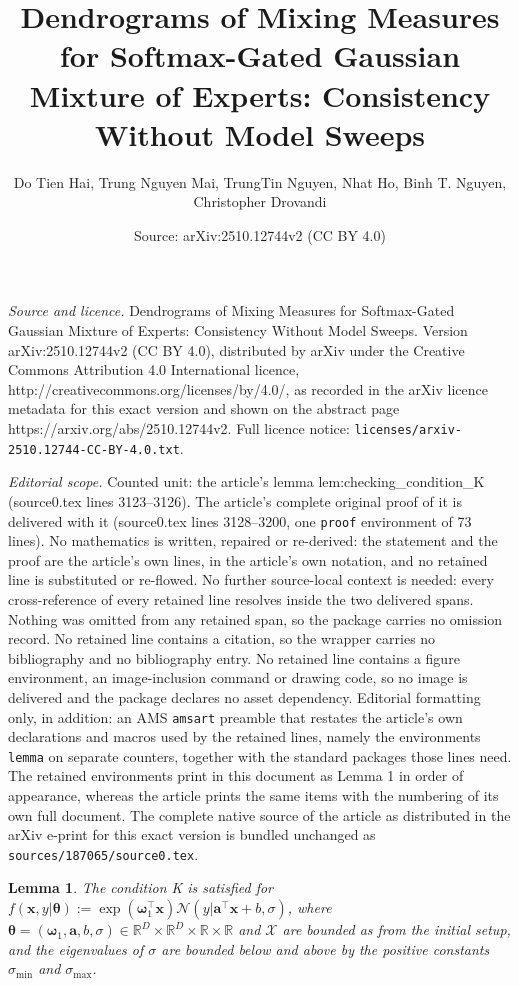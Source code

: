 \documentclass[10pt,a4paper]{amsart}
\title{Dendrograms of Mixing Measures for Softmax-Gated Gaussian Mixture of Experts: Consistency Without Model Sweeps}
\author{Do Tien Hai, Trung Nguyen Mai, TrungTin Nguyen, Nhat Ho, Binh T. Nguyen, Christopher Drovandi}
\date{Source: arXiv:2510.12744v2 (CC BY 4.0)}
\newtheorem{lemma}{Lemma}
\newcommand{\R}{\mathbb{R}}
\newcommand{\cX}{\mathcal{X}}
\def\va{{\bm{a}}}
\def\vomega{{\bm{\omega}}}
\def\vtheta{{\bm{\theta}}}
\def\vx{{\bm{x}}}
\begin{document}
\maketitle

\noindent\emph{Source and licence.} Dendrograms of Mixing Measures for Softmax-Gated Gaussian Mixture of Experts: Consistency Without Model Sweeps. Version arXiv:2510.12744v2 (CC BY 4.0), distributed by arXiv under the Creative Commons Attribution 4.0 International licence, http://creativecommons.org/licenses/by/4.0/, as recorded in the arXiv licence metadata for this exact version and shown on the abstract page https://arxiv.org/abs/2510.12744v2. Full licence notice: \texttt{licenses/arxiv-2510.12744-CC-BY-4.0.txt}.\par\smallskip

\noindent\textit{Editorial scope.} Counted unit: the article's lemma lem:checking\_condition\_K (source0.tex lines 3123--3126). The article's complete original proof of it is delivered with it (source0.tex lines 3128--3200, one \texttt{proof} environment of 73 lines). No mathematics is written, repaired or re-derived: the statement and the proof are the article's own lines, in the article's own notation, and no retained line is substituted or re-flowed.  No further source-local context is needed: every cross-reference of every retained line resolves inside the two delivered spans.  Nothing was omitted from any retained span, so the package carries no omission record.  No retained line contains a citation, so the wrapper carries no bibliography and no bibliography entry.  No retained line contains a figure environment, an image-inclusion command or drawing code, so no image is delivered and the package declares no asset dependency.  Editorial formatting only, in addition: an AMS \texttt{amsart} preamble that restates the article's own declarations and macros used by the retained lines, namely the environments \texttt{lemma} on separate counters, together with the standard packages those lines need.  The retained environments print in this document as Lemma 1 in order of appearance, whereas the article prints the same items with the numbering of its own full document.  The complete native source of the article as distributed in the arXiv e-print for this exact version is bundled unchanged as \texttt{sources/187065/source0.tex}.
\begin{lemma}\label{lem:checking_condition_K}
    The condition K is satisfied for $f(\vx, y | \vtheta)
:= \exp \left(\vomega_{1}^{\top} \vx\right) \mathcal{N}\left(y | \va^{\top} \vx + b, \sigma\right)$, where $\vtheta = (\vomega_{1}, \va, b, \sigma) \in \R^D \times \R^D \times \R \times \R$ and $\cX$ are bounded as from the initial setup, and the eigenvalues of $\sigma$ are bounded below and above by the positive constants $\sigma_{\min }$ and $\sigma_{\max }$.
\end{lemma}
\end{document}
